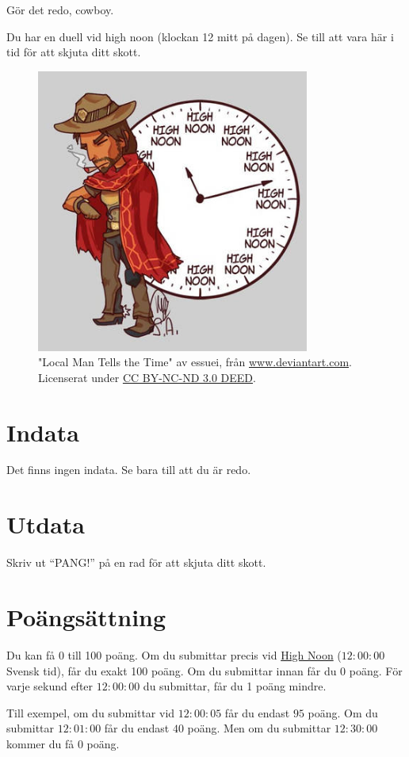
Gör det redo, cowboy. 

Du har en duell vid high noon (klockan 12 mitt på dagen). 
Se till att vara här i tid för att skjuta ditt skott.

\begin{centering}
  \begin{figure}[h]
      \centering
      \includegraphics[width=0.8\textwidth]{highnoon.jpg}
      \caption{"Local Man Tells the Time" av essuei, från \href{https://www.deviantart.com/essuei/art/Overwatch-Local-Man-Tells-the-Time-614496598}{www.deviantart.com}. Licenserat under \href{https://creativecommons.org/licenses/by-nc-nd/3.0/}{CC BY-NC-ND 3.0 DEED}.}
  \end{figure}
\end{centering}

\section*{Indata}
Det finns ingen indata. Se bara till att du är redo.

\section*{Utdata}
Skriv ut ``PANG!'' på en rad för att skjuta ditt skott.

\section*{Poängsättning}
Du kan få 0 till 100 poäng. Om du submittar precis vid \href{https://www.timeanddate.com/worldclock/fixedtime.html?msg=Ready+yourself%2C+Cowboy&iso=20240401T12&p1=239}{High Noon} 
($12:00:00$ Svensk tid), får du exakt 100 poäng. Om du submittar innan får du 0 poäng. För varje sekund efter $12:00:00$ du submittar, får du 1 poäng mindre. 

Till exempel, om du submittar vid $12:00:05$ får du endast $95$ poäng. Om du submittar $12:01:00$ får du endast $40$ poäng.
Men om du submittar $12:30:00$ kommer du få $0$ poäng.
